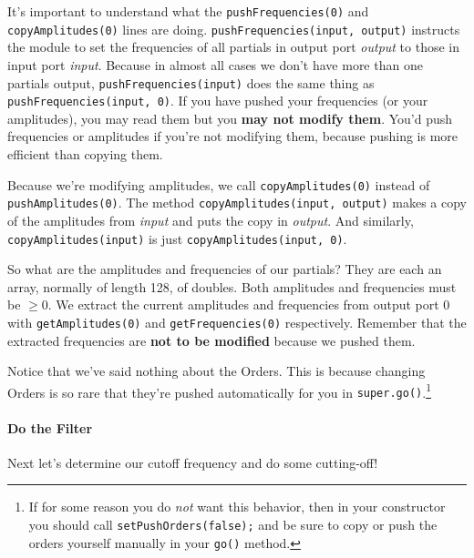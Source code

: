 \documentclass{article}
\begin{document}
It's important to understand what the {\tt pushFrequencies(0)} and {\tt copyAmplitudes(0)} lines are doing.  {\tt pushFrequencies(input, output)} instructs the module to set the frequencies of all partials in output port {\it output} to those in input port {\it input}.  Because in almost all cases we don't have more than one partials output,   {\tt pushFrequencies(input)} does the same thing as  {\tt pushFrequencies(input, 0)}.  If you have pushed your frequencies (or your amplitudes), you may read them but you {\bf may not modify them}.  You'd push frequencies or amplitudes if you're not modifying them, because pushing is more efficient than copying them.

Because we're modifying amplitudes, we call {\tt copyAmplitudes(0)} instead of {\tt pushAmplitudes(0)}.  The method {\tt copyAmplitudes(input, output)} makes a copy of the amplitudes from {\it input} and puts the copy in {\it output}.  And similarly, {\tt copyAmplitudes(input)} is just {\tt copyAmplitudes(input, 0)}.

So what are the amplitudes and frequencies of our partials? They are each an array, normally of length 128, of doubles.  Both amplitudes and frequencies must be \(\geq 0\).  We extract the current amplitudes and frequencies from output port 0 with {\tt getAmplitudes(0)} and {\tt getFrequencies(0)} respectively.  Remember that the extracted frequencies are {\bf not to be modified} because we pushed them.

Notice that we've said nothing about the Orders.  This is because changing Orders is so rare that they're pushed automatically for you in {\tt super.go()}.\footnote{If for some reason you do {\it not} want this behavior, then in your constructor you should call {\tt setPushOrders(false);} and be sure to copy or push the orders yourself manually in your {\tt go()} method.}

\paragraph{Do the Filter} 
Next let's determine our cutoff frequency and do some cutting-off!
\end{document}
